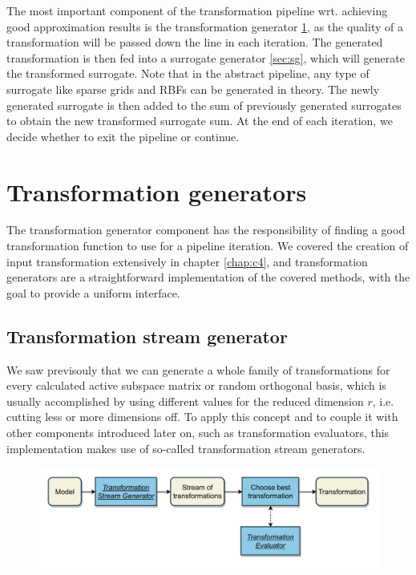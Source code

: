 \documentclass[
  a4paper,  %
  twoside,  %
  bibliography=totoc,
  headsepline,
  cleardoublepage=empty,
  parskip=half,
  draft=false
]{scrbook}
\begin{document}
The most important component of the transformation pipeline wrt. achieving good approximation results is the transformation generator \cref{sec:tg}, as the quality of a transformation will be passed down the line in each iteration.
The generated transformation is then fed into a surrogate generator \cref{sec:sg}, which will generate the transformed surrogate.
Note that in the abstract pipeline, any type of surrogate like sparse grids and RBFs can be generated in theory.
The newly generated surrogate is then added to the sum of previously generated surrogates to obtain the new transformed surrogate sum.
At the end of each iteration, we decide whether to exit the pipeline or continue.


\newpage
\section {Transformation generators}
\label{sec:tg}

The transformation generator component has the responsibility of finding a good transformation function to use for a pipeline iteration.
We covered the creation of input transformation extensively in chapter \cref{chap:c4}, and transformation generators are a straightforward implementation of the covered methods, with the goal to provide a uniform interface.

\subsection {Transformation stream generator}
\label{sec:tsg}

We saw previsouly that we can generate a whole family of transformations for every calculated active subspace matrix or random orthogonal basis, which is usually accomplished by using different values for the reduced dimension $r$, i.e. cutting less or more dimensions off.
To apply this concept and to couple it with other components introduced later on, such as transformation evaluators, this implementation makes use of so-called transformation stream generators.

\begin{mdframed}[style=style,frametitle={Transformation generator (stream-based)}]
\begin{figure}[H]
\includegraphics[width=\textwidth]{graphics/TransformationGen_Stream.pdf}
\delimit

\end{figure}
\end{mdframed}
\end{document}
